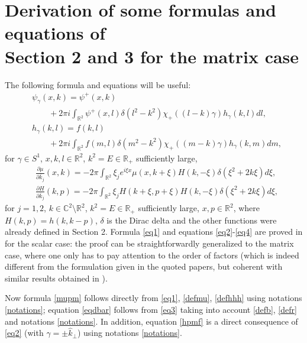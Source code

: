 \documentclass[11pt,a4paper,english,subeqn]{amsart}
\theoremstyle{plain}
\theoremstyle{definition}
\numberwithin{equation}{section}
\begin{document}
\section{Derivation of some formulas and equations of \\ Section 2 and 3 for the matrix case}
The following formula and equations will be useful:
\begin{align} \label{eq1}
&\psi_{\gamma}(x,k) = \psi^+ (x,k) \\ \nonumber
&\qquad + 2 \pi i \int_{{\mathbb{R}}^2} \psi^+(x,l)\delta(l^2-k^2) \chi_+((l-k)\gamma)h_{\gamma}(k,l) dl,\\ \label{eq2}
&h_{\gamma}(k,l) = f(k,l) \\ \nonumber
&\qquad + 2 \pi i \int_{{\mathbb{R}}^2}f(m,l) \delta(m^2-k^2)\chi_+((m-k)\gamma)h_{\gamma}(k,m)dm,
\end{align}
for $\gamma \in S^1$, $x,k,l \in {\mathbb{R}}^2$, $k^2=E \in {\mathbb{R}}_+$ sufficiently large,
\begin{align} \label{eq3}
& \frac{\partial \mu}{\partial \bar k_j}(x,k)= - 2 \pi \int_{{\mathbb{R}}^2}\xi_j e^{i\xi x}\mu(x,k+\xi) H(k,-\xi) \delta(\xi^2+2k\xi) d\xi,\\ \label{eq4}
&\frac{\partial H}{\partial \bar k_j} (k,p) = - 2 \pi \int_{{\mathbb{R}}^2}\xi_j H(k+\xi,p+\xi)H(k,-\xi) \delta(\xi^2 + 2k\xi) d\xi,
\end{align}
for $j =1,2$, $k \in {\mathbb{C}}^2 \setminus {\mathbb{R}}^2$, $k^2=E \in {\mathbb{R}}_+$ sufficiently large, $x,p \in {\mathbb{R}}^2$, where $H(k,p) = h(k,k-p)$, $\delta$ is the Dirac delta and the other functions were already defined in Section 2. Formula \eqref{eq1} and equations \eqref{eq2}-\eqref{eq4} are proved in \cite{F2, BC, HN} for the scalar case: the proof can be straightforwardly generalized to the matrix case, where one only has to pay attention to the order of factors (which is indeed different from the formulation given in the quoted papers, but coherent with similar results obtained in \cite{X}).\smallskip

Now formula \eqref{mupm} follows directly from \eqref{eq1}, \eqref{defmu}, \eqref{defhhh} using notations \eqref{notations}; equation \eqref{eqdbar} follows from \eqref{eq3} taking into account \eqref{defb}, \eqref{defr} and notations \eqref{notations}. In addition, equation \eqref{hpmf} is a direct consequence of \eqref{eq2} (with $\gamma = \pm \hat k_{\bot}$) using notations \eqref{notations}.
\end{document}
